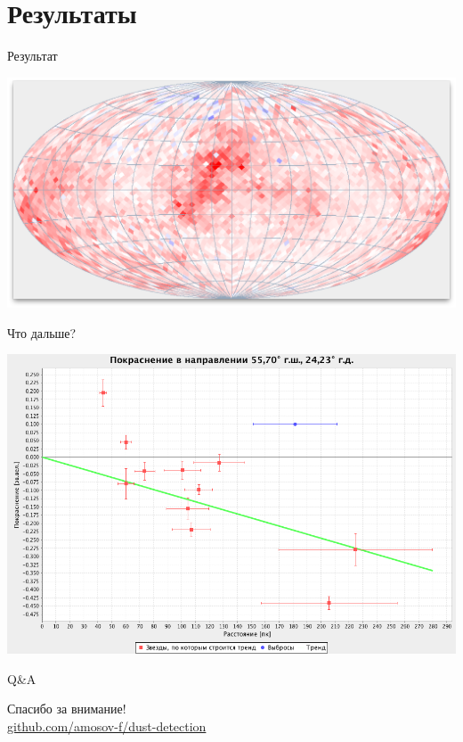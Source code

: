 \documentclass[14pt, fleqn, xcolor={dvipsnames, table}]{beamer}
\begin{document}
    \section{Результаты}                
        
        \begin{frame}{Результат}
            \begin{center}
                \includegraphics[scale=0.32]{map-k.png}
            \end{center}             
        \end{frame}
        
        \begin{frame}{Что дальше?}
            \begin{center}
                \includegraphics[scale=0.35]{next-k.png}
            \end{center}             
        \end{frame}    
        
        \begin{frame}{Q\&A}
            \begin{center}
                Спасибо за внимание!\\
                \href{https://github.com/amosov-f/dust-detection}{github.com/amosov-f/dust-detection}
            \end{center}
        \end{frame}
\end{document}
